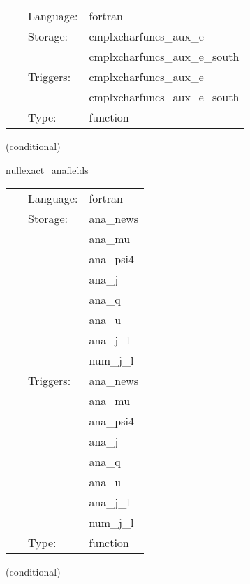  \begin{tabular*}{160mm}{cll} 
~ & Language:  & fortran \\ 
~ & Storage:  & cmplxcharfuncs\_aux\_e \\ 
~& ~ &cmplxcharfuncs\_aux\_e\_south\\ 
~ & Triggers:  & cmplxcharfuncs\_aux\_e \\ 
~& ~ &cmplxcharfuncs\_aux\_e\_south\\ 
~ & Type:  & function \\ 
\end{tabular*} 


\vspace{5mm}

   (conditional) 

\hspace{5mm} nullexact\_anafields 

\hspace{5mm}{\it error in characteristic evolution variables } 


\hspace{5mm}

 \begin{tabular*}{160mm}{cll} 
~ & Language:  & fortran \\ 
~ & Storage:  & ana\_news \\ 
~& ~ &ana\_mu\\ 
~& ~ &ana\_psi4\\ 
~& ~ &ana\_j\\ 
~& ~ &ana\_q\\ 
~& ~ &ana\_u\\ 
~& ~ &ana\_j\_l\\ 
~& ~ &num\_j\_l\\ 
~ & Triggers:  & ana\_news \\ 
~& ~ &ana\_mu\\ 
~& ~ &ana\_psi4\\ 
~& ~ &ana\_j\\ 
~& ~ &ana\_q\\ 
~& ~ &ana\_u\\ 
~& ~ &ana\_j\_l\\ 
~& ~ &num\_j\_l\\ 
~ & Type:  & function \\ 
\end{tabular*} 


\vspace{5mm}

   (conditional) 

